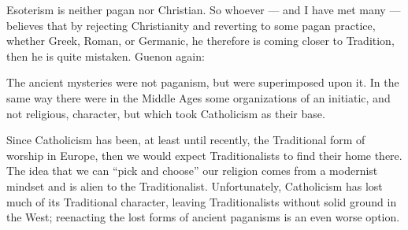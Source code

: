 Esoterism is neither pagan nor Christian. So whoever --- and I have met many --- believes that by rejecting Christianity and reverting to some pagan practice, whether Greek, Roman, or Germanic, he therefore is coming closer to Tradition, then he is quite mistaken. Guenon again:

\begin{quotex}
The ancient mysteries were not paganism, but were superimposed upon it. In the same way there were in the Middle Ages some organizations of an initiatic, and not religious, character, but which took Catholicism as their base.
\end{quotex}


Since Catholicism has been, at least until recently, the Traditional form of worship in Europe, then we would expect Traditionalists to find their home there. The idea that we can ``pick and choose'' our religion comes from a modernist mindset and is alien to the Traditionalist. Unfortunately, Catholicism has lost much of its Traditional character, leaving Traditionalists without solid ground in the West; reenacting the lost forms of ancient paganisms is an even worse option.



